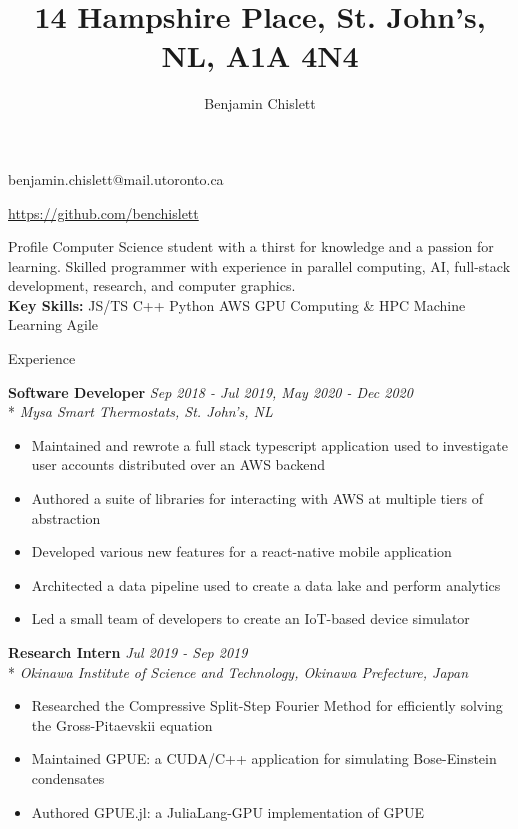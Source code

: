 \documentclass[11pt, letterpaper]{article}
\title{14 Hampshire Place, St. John's, NL, A1A 4N4}
\author{Benjamin Chislett}
\date{}
\newcommand{\vbar}{\textbar\xspace}
\begin{document}
\begin{center}
  \Huge\theauthor
  \par
  \large{benjamin.chislett@mail.utoronto.ca}
  \par
  \large\url{https://github.com/benchislett}
\end{center}

\begin{section}{Profile}
Computer Science student with a thirst for knowledge and a passion for learning.
Skilled programmer with experience in parallel computing, AI, full-stack development, research, and computer graphics.
\\

\textbf{Key Skills:} JS/TS \vbar C++ \vbar Python \vbar AWS \vbar GPU Computing \& HPC \vbar Machine Learning \vbar Agile

\end{section}

\begin{section}{Experience}

\textbf{Software Developer}
\hfill
\textit{Sep 2018 - Jul 2019, May 2020 - Dec 2020}\\*
\textit{Mysa Smart Thermostats, St. John's, NL}
\begin{itemize}
  \item Maintained and rewrote a full stack typescript application used to investigate user accounts distributed over an AWS backend
  \item Authored a suite of libraries for interacting with AWS at multiple tiers of abstraction
  \item Developed various new features for a react-native mobile application
  \item Architected a data pipeline used to create a data lake and perform analytics
  \item Led a small team of developers to create an IoT-based device simulator \\
\end{itemize}

\textbf{Research Intern}
\hfill
\textit{Jul 2019 - Sep 2019}\\*
\textit{Okinawa Institute of Science and Technology, Okinawa Prefecture, Japan}
\begin{itemize}
  \item Researched the Compressive Split-Step Fourier Method for efficiently solving the Gross-Pitaevskii equation
  \item Maintained GPUE: a CUDA/C++ application for simulating Bose-Einstein condensates
  \item Authored GPUE.jl: a JuliaLang-GPU implementation of GPUE
\end{itemize}

\end{section}
\end{document}
